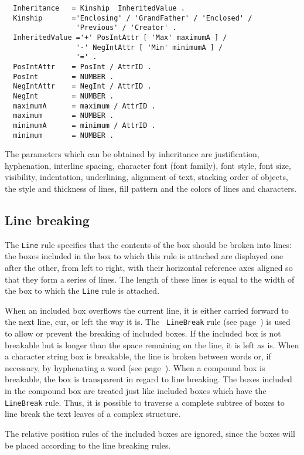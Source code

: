 \begin{verbatim}
  Inheritance   = Kinship  InheritedValue .
  Kinship       ='Enclosing' / 'GrandFather' / 'Enclosed' /
                 'Previous' / 'Creator' .
  InheritedValue ='+' PosIntAttr [ 'Max' maximumA ] /
                 '-' NegIntAttr [ 'Min' minimumA ] /
                 '=' .
  PosIntAttr    = PosInt / AttrID .
  PosInt        = NUMBER .
  NegIntAttr    = NegInt / AttrID .
  NegInt        = NUMBER .
  maximumA      = maximum / AttrID .
  maximum       = NUMBER .
  minimumA      = minimum / AttrID .
  minimum       = NUMBER .
\end{verbatim}

The parameters which can be obtained by inheritance are justification,
hyphenation, interline spacing, character font (font family), font
style, font size, visibility, indentation, underlining, alignment of
text, stacking order of objects, the style and thickness of lines,
fill pattern and the colors of lines and characters.

\subsection{Line breaking}
\label{regleline}

The {\tt Line} rule specifies that the contents of the box should be
broken into lines: the boxes included in the box to which this rule is
attached are displayed one after the other, from left to right, with
their horizontal reference axes aligned so that they form a series of
lines.  The length of these lines is equal to the width of the box to
which the {\tt Line} rule is attached.

When an included box overflows the current line, it is either carried
forward to the next line, cur, or left the way it is.  The {\tt
LineBreak} rule (see page~\pageref{condcoupure}) is used to allow or
prevent the breaking of included boxes.  If the included box is not
breakable but is longer than the space remaining on the line, it is
left as is.  When a character string box is breakable, the line is
broken between words or, if necessary, by hyphenating a word (see
page~\pageref{reglehyphenate}).  When a compound box is breakable, the
box is transparent in regard to line breaking.  The boxes included in
the compound box are treated just like included boxes which have the
{\tt LineBreak} rule.  Thus, it is possible to traverse a complete
subtree of boxes to line break the text leaves of a complex structure.

The relative position rules of the included boxes are ignored, since the
boxes will be placed according to the line breaking rules.

